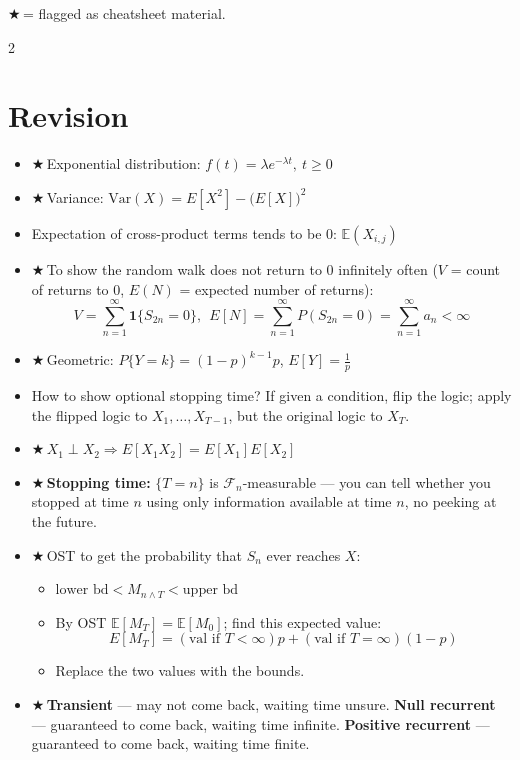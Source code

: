 \documentclass[8pt,letterpaper]{extarticle}
\newcommand{\bodysize}{\footnotesize}   %
\newcommand{\cs}{{\color{red!75!black}$\bigstar$}\,} %
\begin{document}
\bodysize\raggedright

{\cs = flagged as cheatsheet material.}

\begin{multicols}{2}

\section{Revision}
\begin{itemize}
  \item \cs Exponential distribution: $f(t)=\lambda e^{-\lambda t},\ t\ge 0$
  \item \cs Variance: $\mathrm{Var}(X)=E[X^2]-\big(E[X]\big)^2$
  \item Expectation of cross-product terms tends to be $0$: $\mathbb{E}(X_{i,j})$
  \item \cs To show the random walk does not return to $0$ infinitely often ($V$ = count of returns to $0$, $E(N)$ = expected number of returns):
    \[ V=\sum_{n=1}^{\infty}\mathbf{1}\{S_{2n}=0\},\ \ E[N]=\sum_{n=1}^{\infty}P(S_{2n}=0)=\sum_{n=1}^{\infty}a_n<\infty \]
  \item \cs Geometric: $P\{Y=k\}=(1-p)^{k-1}p$, $E[Y]=\frac{1}{p}$
  \item How to show optional stopping time? If given a condition, flip the logic; apply the flipped logic to $X_1,\dots,X_{T-1}$, but the original logic to $X_T$.
  \item \cs $X_1 \perp X_2 \Rightarrow E[X_1X_2]=E[X_1]E[X_2]$
  \item \cs \textbf{Stopping time:} $\{T=n\}$ is $\mathcal{F}_n$-measurable --- you can tell whether you stopped at time $n$ using only information available at time $n$, no peeking at the future.
  \item \cs OST to get the probability that $S_n$ ever reaches $X$:
    \begin{itemize}
      \item $\text{lower bd} < M_{n\wedge T} < \text{upper bd}$
      \item By OST $\mathbb{E}[M_T]=\mathbb{E}[M_0]$; find this expected value:
        \[ E[M_T]=(\text{val if }T<\infty)p+(\text{val if }T=\infty)(1-p) \]
      \item Replace the two values with the bounds.
    \end{itemize}
  \item \cs \textbf{Transient} --- may not come back, waiting time unsure. \textbf{Null recurrent} --- guaranteed to come back, waiting time infinite. \textbf{Positive recurrent} --- guaranteed to come back, waiting time finite.

\end{itemize}
\end{multicols}
\end{document}
